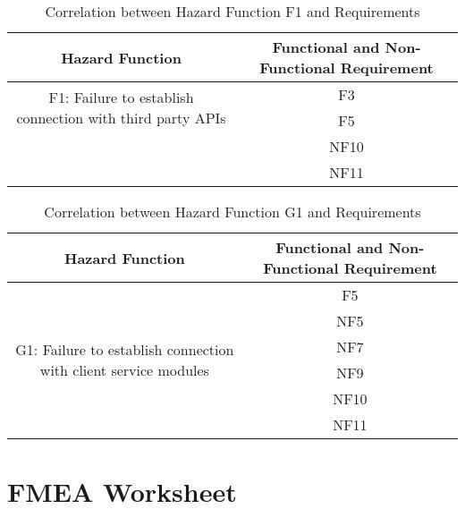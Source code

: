 \documentclass{article}
\begin{document}
\begin{table}[H]
    \centering
    \begin{tabular}{|c|c|} \hline
        \textbf{Hazard Function} & \textbf{Functional and Non-Functional Requirement} \\ \hline
        \multirow{2}{0.5\textwidth}{F1: Failure to establish connection with third party APIs
} & F3\\ \cline{2-2}
         &  F5\\ \cline{2-2}
         &  NF10\\ \cline{2-2}
         &  NF11\\ \hline
    \end{tabular}
    \caption{Correlation between Hazard Function F1 and Requirements}
    \label{tab:F1Req}
\end{table}

\begin{table}[H]
    \centering
    \begin{tabular}{|c|c|} \hline
        \textbf{Hazard Function} & \textbf{Functional and Non-Functional Requirement} \\ \hline
        \multirow{6}{0.5\textwidth}{G1: Failure to establish connection with client service modules} & F5\\ \cline{2-2}
         & NF5\\ \cline{2-2}
         & NF7\\ \cline{2-2}
         & NF9\\ \cline{2-2}
         & NF10\\ \cline{2-2}
         & NF11\\ \hline
    \end{tabular}
    \caption{Correlation between Hazard Function G1 and Requirements}
    \label{tab:G1Req}
\end{table}

\section{FMEA Worksheet}
\end{document}
